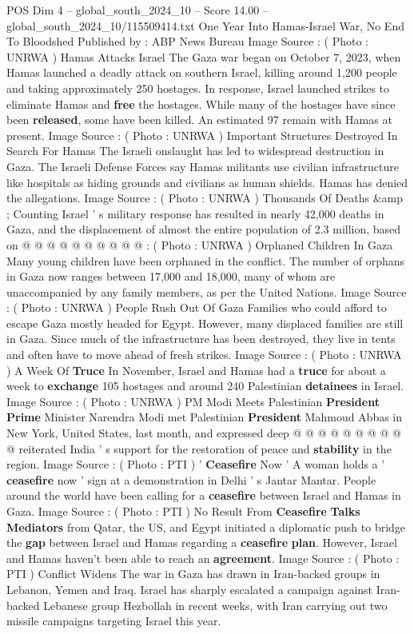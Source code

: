 \begin{textsample}{POS Dim 4 – global\_south\_2024\_10 – Score 14.00 – global\_south\_2024\_10/115509414.txt}  \label{ex:f4_pos_389}
One Year Into Hamas-Israel War, No End To Bloodshed Published by : ABP News Bureau Image Source : ( Photo : UNRWA ) Hamas Attacks Israel The Gaza war began on October 7, 2023, when Hamas launched a deadly attack on southern Israel, killing around 1,200 people and taking approximately 250 hostages.
In response, Israel launched strikes to eliminate Hamas and \textbf{free} the hostages.
While many of the hostages have since been \textbf{released}, some have been killed.
An estimated 97 remain with Hamas at present.
Image Source : ( Photo : UNRWA ) Important Structures Destroyed In Search For Hamas The Israeli onslaught has led to widespread destruction in Gaza.
The Israeli Defense Forces say Hamas militants use civilian infrastructure like hospitals as hiding grounds and civilians as human shields.
Hamas has denied the allegations.
Image Source : ( Photo : UNRWA ) Thousands Of Deaths \&amp ; Counting Israel ' s military response has resulted in nearly 42,000 deaths in Gaza, and the displacement of almost the entire population of 2.3 million, based on @ @ @ @ @ @ @ @ @ @ : ( Photo : UNRWA ) Orphaned Children In Gaza Many young children have been orphaned in the conflict.
The number of orphans in Gaza now ranges between 17,000 and 18,000, many of whom are unaccompanied by any family members, as per the United Nations.
Image Source : ( Photo : UNRWA ) People Rush Out Of Gaza Families who could afford to escape Gaza mostly headed for Egypt.
However, many displaced families are still in Gaza.
Since much of the infrastructure has been destroyed, they live in tents and often have to move ahead of fresh strikes.
Image Source : ( Photo : UNRWA ) A Week Of \textbf{Truce} In November, Israel and Hamas had a \textbf{truce} for about a week to \textbf{exchange} 105 hostages and around 240 Palestinian \textbf{detainees} in Israel.
Image Source : ( Photo : UNRWA ) PM Modi Meets Palestinian \textbf{President} \textbf{Prime} Minister Narendra Modi met Palestinian \textbf{President} Mahmoud Abbas in New York, United States, last month, and expressed deep @ @ @ @ @ @ @ @ @ @ reiterated India ' s support for the restoration of peace and \textbf{stability} in the region.
Image Source : ( Photo : PTI ) ' \textbf{Ceasefire} Now ' A woman holds a ' \textbf{ceasefire} now ' sign at a demonstration in Delhi ' s Jantar Mantar.
People around the world have been calling for a \textbf{ceasefire} between Israel and Hamas in Gaza.
Image Source : ( Photo : PTI ) No Result From \textbf{Ceasefire} \textbf{Talks} \textbf{Mediators} from Qatar, the US, and Egypt initiated a diplomatic push to bridge the \textbf{gap} between Israel and Hamas regarding a \textbf{ceasefire} \textbf{plan}.
However, Israel and Hamas haven't been able to reach an \textbf{agreement}.
Image Source : ( Photo : PTI ) Conflict Widens The war in Gaza has drawn in Iran-backed groups in Lebanon, Yemen and Iraq.
Israel has sharply escalated a campaign against Iran-backed Lebanese group Hezbollah in recent weeks, with Iran carrying out two missile campaigns targeting Israel this year.

\end{textsample}
